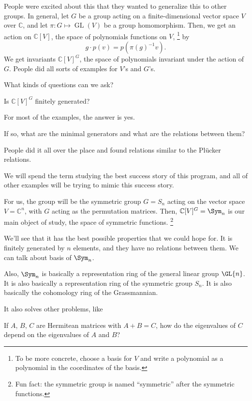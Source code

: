 People were excited about this that they wanted to generalize this to other groups.
In general, let \(G\) be a group acting on a finite-dimensional vector space \(V\) over \(\mathbb{C}\), and let \(\pi \colon G \mapsto \operatorname{GL}(V)\) be a group homomorphism.
Then, we get an action on \(\mathbb{C}[V]\), the space of polynomials functions on \(V\),%
\footnote{To be more concrete, choose a basis for \(V\) and write a polynomial as a polynomial in the coordinates of the basis.}
by 
\begin{equation}
    g \cdot p(v) = p(\pi(g)^{-1}v).
\end{equation}
We get invariants \(\mathbb{C}[V]^G\), the space of polynomials invariant under the action of \(G\).
People did all sorts of examples for \(V\)'s and \(G\)'s.

What kinds of questions can we ask?

\begin{question}
    Is \(\mathbb{C}[V]^G\) finitely generated?
\end{question}

For most of the examples, the answer is yes.

\begin{question}
    If so, what are the minimal generators and what are the relations between them?
\end{question}

People did it all over the place and found relations similar to the Plücker relations.

We will spend the term studying the best success story of this program,
and all of other examples will be trying to mimic this success story.

For us, the group will be the symmetric group \(G = S_n\) acting on the vector space \(V = \mathbb{C}^n\), with \(G\) acting as the permutation matrices.
Then, \(\mathbb{C}[V]^G = \Sym_n\) is our main object of study, the space of symmetric functions.%
\footnote{Fun fact: the symmetric group is named ``symmetric'' after the symmetric functions.}

We'll see that it has the best possible properties that we could hope for.
It is finitely generated by \(n\) elements, and they have no relations between them.
We can talk about basis of \(\Sym_n\).

Also, \(\Sym_n\) is basically a representation ring of the general linear group \(\GL{n}\).
It is also basically a representation ring of the symmetric group \(S_n\).
It is also basically the cohomology ring of the Grassmannian.

It also solves other problems, like
\begin{question}
    If \(A\), \(B\), \(C\) are Hermitean matrices
    with \(A + B = C\),
    how do the eigenvalues of \(C\) depend on the eigenvalues of \(A\) and \(B\)?
\end{question}